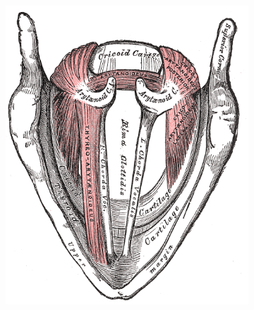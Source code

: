 \documentclass[12pt, letter]{report}
\begin{document}
\begin{figure}
\centering
\begin{subfigure}[b]{0.4\linewidth}
\centering
\includegraphics[width=\linewidth]{larynx_muscles_top.png}
\caption{}
\end{subfigure}
\begin{subfigure}[b]{0.4\linewidth}
\centering

\end{subfigure}
\end{figure}
\end{document}
